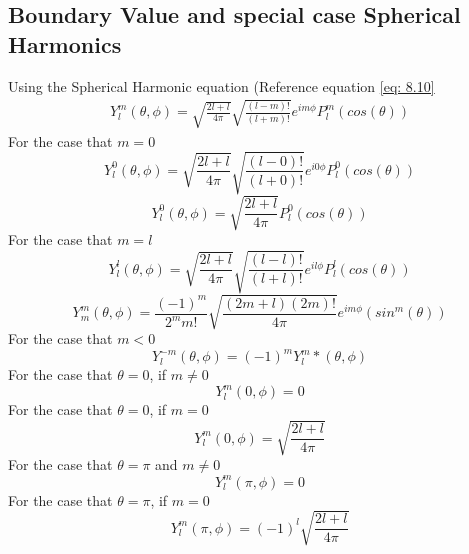 \documentclass[12pt]{article}
\begin{document}
\subsection{Boundary Value and special case Spherical Harmonics}
    Using the Spherical Harmonic equation (Reference equation \ref{eq: 8.10}
    \begin{gather*}
        Y_{l}^{m}(\theta, \phi) = \sqrt{\frac{2l+l}{4\pi}} \sqrt{\frac{(l-m)!}{(l+m)!}} e^{i m \phi} P_l^m (cos(\theta))
    \end{gather*}
    For the case that $m=0$
    \begin{equation} \label{eq: 9.1}
        Y_{l}^{0}(\theta, \phi) = \sqrt{\frac{2l+l}{4\pi}} \sqrt{\frac{(l-0)!}{(l+0)!}} e^{i 0 \phi} P_l^0 (cos(\theta))
    \end{equation}
    \begin{equation} \label{eq: 9.2}
        Y_{l}^{0}(\theta, \phi) = \sqrt{\frac{2l+l}{4\pi}} P_l^0 (cos(\theta))
    \end{equation}
    For the case that $m=l$
    \begin{equation} \label{eq: 9.3}
        Y_{l}^{l}(\theta, \phi) = \sqrt{\frac{2l+l}{4\pi}} \sqrt{\frac{(l-l)!}{(l+l)!}} e^{i l \phi} P_l^l (cos(\theta))
    \end{equation}
    \begin{equation} \label{eq: 9.4}
        Y_{m}^{m}(\theta, \phi) = \frac{{(-1)}^m}{2^m m!} \sqrt{\frac{(2m+l)(2m)!}{4\pi}}  e^{i m \phi} (sin^m(\theta))
    \end{equation}
    For the case that $m<0$
    \begin{equation} \label{eq: 9.5}
        Y_{l}^{-m}(\theta, \phi) = {(-1)}^m Y_l^m*(\theta, \phi)
    \end{equation}
    For the case that $\theta=0$, if $m\neq0$
    \begin{equation} \label{eq: 9.6}
        Y_{l}^{m}(0, \phi) = 0
    \end{equation}
    For the case that $\theta=0$, if $m=0$
    \begin{equation} \label{eq: 9.7}
        Y_{l}^{m}(0, \phi) = \sqrt{\frac{2l + l}{4 \pi}}
    \end{equation}    
    For the case that $\theta = \pi$ and $m\neq0$
    \begin{equation} \label{eq: 9.8}
        Y_{l}^{m}(\pi, \phi) = 0
    \end{equation}
    For the case that $\theta=\pi$, if $m=0$
    \begin{equation} \label{eq: 9.9}
        Y_{l}^{m}(\pi, \phi) = (-1)^l \sqrt{\frac{2l + l}{4 \pi}}
    \end{equation}   
\end{document}
